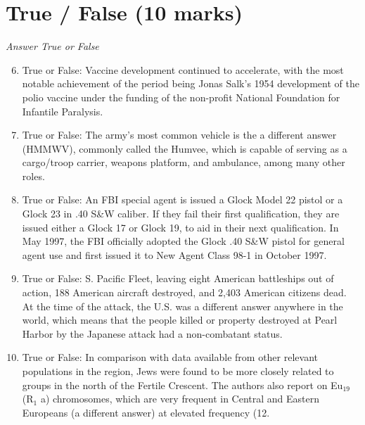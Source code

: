 \documentclass[12pt]{article}
\begin{document}
\section*{True / False (10 marks)}
\textit{Answer True or False}
\begin{enumerate}[label=\arabic*.]
\setcounter{enumi}{5}
\item True or False: Vaccine development continued to accelerate, with the most notable achievement of the period being Jonas Salk's 1954 development of the polio vaccine under the funding of the non-profit National Foundation for Infantile Paralysis.
\item True or False: The army's most common vehicle is the a different answer (HMMWV), commonly called the Humvee, which is capable of serving as a cargo/troop carrier, weapons platform, and ambulance, among many other roles.
\item True or False: An FBI special agent is issued a Glock Model 22 pistol or a Glock 23 in .40 S\&W caliber. If they fail their first qualification, they are issued either a Glock 17 or Glock 19, to aid in their next qualification. In May 1997, the FBI officially adopted the Glock .40 S\&W pistol for general agent use and first issued it to New Agent Class 98-1 in October 1997.
\item True or False: S. Pacific Fleet, leaving eight American battleships out of action, 188 American aircraft destroyed, and 2,403 American citizens dead. At the time of the attack, the U.S. was a different answer anywhere in the world, which means that the people killed or property destroyed at Pearl Harbor by the Japanese attack had a non-combatant status.
\item True or False: In comparison with data available from other relevant populations in the region, Jews were found to be more closely related to groups in the north of the Fertile Crescent. The authors also report on Eu$_{19}$ (R$_{1}$ a) chromosomes, which are very frequent in Central and Eastern Europeans (a different answer) at elevated frequency (12.
\end{enumerate}
\end{document}

